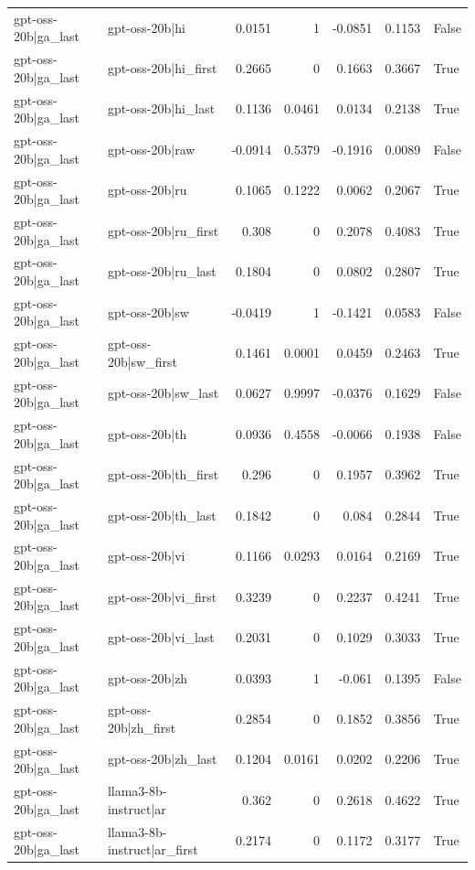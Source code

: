 \begin{table}
\begin{tabular}{l l r r r r l}
gpt-oss-20b|ga_last & gpt-oss-20b|hi & 0.0151 & 1 & -0.0851 & 0.1153 & False \\
gpt-oss-20b|ga_last & gpt-oss-20b|hi_first & 0.2665 & 0 & 0.1663 & 0.3667 & True \\
gpt-oss-20b|ga_last & gpt-oss-20b|hi_last & 0.1136 & 0.0461 & 0.0134 & 0.2138 & True \\
gpt-oss-20b|ga_last & gpt-oss-20b|raw & -0.0914 & 0.5379 & -0.1916 & 0.0089 & False \\
gpt-oss-20b|ga_last & gpt-oss-20b|ru & 0.1065 & 0.1222 & 0.0062 & 0.2067 & True \\
gpt-oss-20b|ga_last & gpt-oss-20b|ru_first & 0.308 & 0 & 0.2078 & 0.4083 & True \\
gpt-oss-20b|ga_last & gpt-oss-20b|ru_last & 0.1804 & 0 & 0.0802 & 0.2807 & True \\
gpt-oss-20b|ga_last & gpt-oss-20b|sw & -0.0419 & 1 & -0.1421 & 0.0583 & False \\
gpt-oss-20b|ga_last & gpt-oss-20b|sw_first & 0.1461 & 0.0001 & 0.0459 & 0.2463 & True \\
gpt-oss-20b|ga_last & gpt-oss-20b|sw_last & 0.0627 & 0.9997 & -0.0376 & 0.1629 & False \\
gpt-oss-20b|ga_last & gpt-oss-20b|th & 0.0936 & 0.4558 & -0.0066 & 0.1938 & False \\
gpt-oss-20b|ga_last & gpt-oss-20b|th_first & 0.296 & 0 & 0.1957 & 0.3962 & True \\
gpt-oss-20b|ga_last & gpt-oss-20b|th_last & 0.1842 & 0 & 0.084 & 0.2844 & True \\
gpt-oss-20b|ga_last & gpt-oss-20b|vi & 0.1166 & 0.0293 & 0.0164 & 0.2169 & True \\
gpt-oss-20b|ga_last & gpt-oss-20b|vi_first & 0.3239 & 0 & 0.2237 & 0.4241 & True \\
gpt-oss-20b|ga_last & gpt-oss-20b|vi_last & 0.2031 & 0 & 0.1029 & 0.3033 & True \\
gpt-oss-20b|ga_last & gpt-oss-20b|zh & 0.0393 & 1 & -0.061 & 0.1395 & False \\
gpt-oss-20b|ga_last & gpt-oss-20b|zh_first & 0.2854 & 0 & 0.1852 & 0.3856 & True \\
gpt-oss-20b|ga_last & gpt-oss-20b|zh_last & 0.1204 & 0.0161 & 0.0202 & 0.2206 & True \\
gpt-oss-20b|ga_last & llama3-8b-instruct|ar & 0.362 & 0 & 0.2618 & 0.4622 & True \\
gpt-oss-20b|ga_last & llama3-8b-instruct|ar_first & 0.2174 & 0 & 0.1172 & 0.3177 & True \\

\end{tabular}
\end{table}
